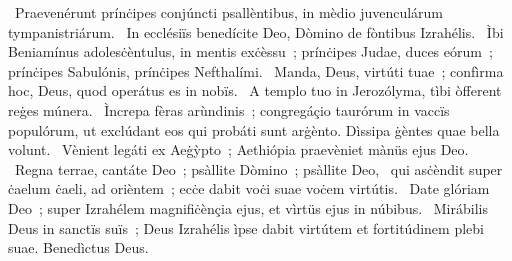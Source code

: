 {~Praevenérunt prínċipes conjúncti psallèntibus, in mèdio juvenculárum tympanistriárum. 
~In ecclésiïs benedícite Deo, Dòmino de fòntibus Izrahélis. 
~Ìbi Beniamínus adolesċèntulus, in mentis exċèssu~; prínċipes Judae, duces eórum~; prínċipes Sabulónis, prínċipes Nefthalími. 
~Manda, Deus, virtúti tuae~; confìrma hoc, Deus, quod operátus es in nobïs. 
~A templo tuo in Jerozólyma, tìbi òfferent reġes múnera. 
~Ìncrepa fèras arùndinis~; congregáçio taurórum in vaccïs populórum, ut exclúdant eos qui probáti sunt arġènto. Dìssipa ġèntes quae bella volunt. 
~Vènient legáti ex Aeġỳpto~; Aethiópia praevèniet mànüs ejus Deo. 
~Regna terrae, cantáte Deo~; psàllite Dòmino~; psàllite Deo, 
~qui asċèndit super ċaelum ċaeli, ad orièntem~; ecċe dabit voċi suae voċem virtútis. 
~Date glóriam Deo~; super Izrahélem magnifiċènçia ejus, et vìrtüs ejus in núbibus. 
~Mirábilis Deus in sanctïs suïs~; Deus Izrahélis ìpse dabit virtútem et fortitúdinem plebi suae. Benedìctus Deus. 
}
